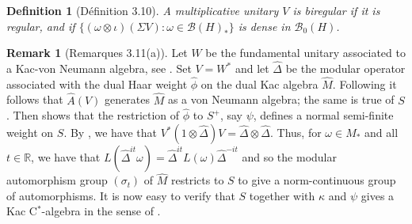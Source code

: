 \documentclass[a4paper,12pt]{article}
\theoremstyle{plain}
\newtheorem{definition}[proposition]{Definition}
\theoremstyle{definition}
\newtheorem{remark}[proposition]{Remark}
\newcommand{\mc}{\mathcal}
\begin{document}
\begin{definition}[D\'efinition 3.10]
A multiplicative unitary $V$ is \emph{biregular} if it is regular, and if
$\{ (\omega\otimes\iota)(\Sigma V) : \omega\in\mc B(H)_* \}$ is dense in
$\mc B_0(H)$.
\end{definition}

\begin{remark}[Remarques 3.11(a)]\label{defn:1}
Let $W$ be the fundamental unitary associated to a Kac-von Neumann algebra,
see \cite{r6}.  Set $V=W^*$ and let $\hat\Delta$ be the modular operator
associated with the dual Haar weight $\hat\phi$ on the dual Kac algebra
$\hat M$.  Following \cite[2.1.5(a)]{r6} it follows that $\hat A(V)$ generates
$\hat M$ as a von Neumann algebra; the same is true of $S$.  Then
\cite[corollaire~3.1.10]{r6} shows that the restriction of $\hat\phi$ to
$S^+$, say $\psi$, defines a normal semi-finite weight on $S$.  By
\cite[Lemme~I.1]{r7}, we have that $V^*(1\otimes\hat\Delta)V = \hat\Delta
\otimes\hat\Delta$.  Thus, for $\omega\in M_*$ and all $t\in\mathbb R$,
we have that $L(\hat\Delta^{it}\omega) = \hat\Delta^{it} L(\omega)
\hat\Delta^{-it}$ and so the modular automorphism group $(\sigma_t)$ of
$\hat M$ restricts to $S$ to give a norm-continuous group of automorphisms.
It is now easy to verify that $S$ together with $\kappa$ and $\psi$ gives
a Kac C$^*$-algebra in the sense of \cite{r50}.
\end{remark}
\end{document}
